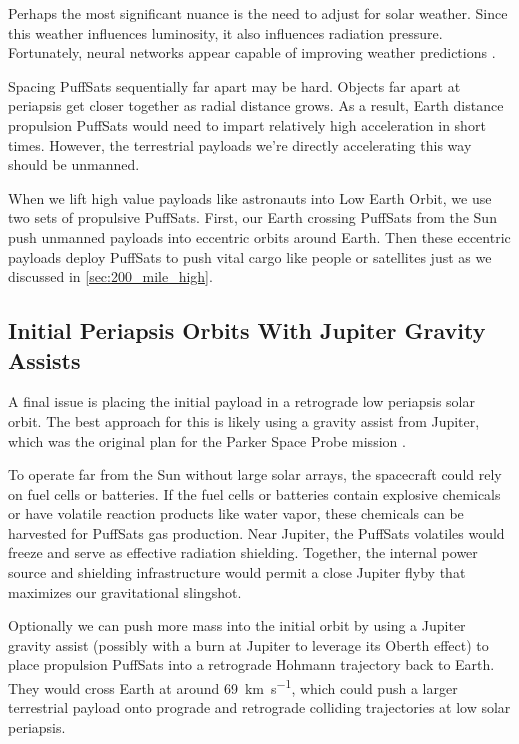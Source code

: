 \documentclass{article}
\begin{document}
{Perhaps the most significant nuance is the need to adjust for solar weather.  Since this weather influences luminosity, it also influences radiation pressure.   Fortunately, neural networks appear capable of improving weather predictions \cite{lam2023learning}.   

Spacing PuffSats sequentially far apart  may be hard.  Objects far apart at periapsis get closer together as radial distance grows.  As a result, Earth distance propulsion PuffSats would need to impart relatively high acceleration in short times.  However, the terrestrial payloads we're directly accelerating this way should be unmanned.   

When we lift high value payloads like astronauts into Low Earth Orbit, we use two sets of propulsive PuffSats. First, our Earth crossing PuffSats from the Sun push unmanned payloads into eccentric orbits around Earth. Then these eccentric payloads deploy PuffSats to push vital cargo like people or  satellites just as we discussed in \autoref{sec:200_mile_high}.

\subsection{Initial Periapsis Orbits With Jupiter Gravity Assists} \label{sec:jupiter_gravity_initial}
A final issue is placing the initial payload in a retrograde low periapsis solar orbit.  The best approach for this is likely using a gravity assist from Jupiter, which was the original plan for the Parker Space Probe mission \cite{mccomas2005solar}. 

To operate far from the Sun without large solar arrays, the spacecraft could rely on fuel cells or batteries. If the fuel cells or batteries contain explosive chemicals or have volatile reaction products like water vapor, these chemicals can be harvested for PuffSats gas production. Near Jupiter, the PuffSats volatiles would freeze and serve as effective radiation shielding. Together, the internal power source and shielding infrastructure would permit a close Jupiter flyby that maximizes our gravitational slingshot.

Optionally we can push more mass into the initial orbit by using a Jupiter gravity assist (possibly with a burn at Jupiter to leverage its Oberth effect) to place propulsion PuffSats into a retrograde Hohmann trajectory back to Earth.   They would cross Earth at around \SI{69}{\kilo\meter\per\second}, which could push a larger terrestrial payload onto  prograde and retrograde colliding trajectories at low solar periapsis.

}
\end{document}
